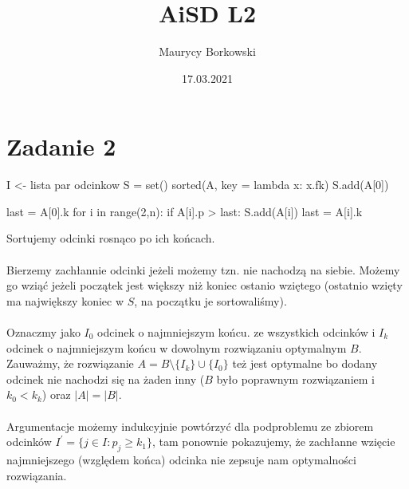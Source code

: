 \documentclass{article}
\title{AiSD L2}
\date{17.03.2021}
\author{Maurycy Borkowski}
\begin{document}
\maketitle

\section{Zadanie 2}
\begin{python}
I <- lista par odcinkow
S = set()
sorted(A, key = lambda x: x.fk)
S.add(A[0])

last = A[0].k
for i in range(2,n):
    if A[i].p > last:
        S.add(A[i])
        last = A[i].k
\end{python}
Sortujemy odcinki rosnąco po ich końcach.\\\\
Bierzemy zachłannie odcinki jeżeli możemy tzn. nie nachodzą na siebie. Możemy go wziąć jeżeli początek jest większy niż koniec ostanio wziętego (ostatnio wzięty ma największy koniec w $S$, na początku je sortowaliśmy).\\\\
Oznaczmy jako $I_0$ odcinek o najmniejszym końcu. ze wszystkich odcinków i $I_k$ odcinek o najmniejszym końcu w dowolnym rozwiązaniu optymalnym $B$. Zauważmy, że rozwiązanie $A = B \setminus \{I_k\} \cup \{I_0\}$ też jest optymalne bo dodany odcinek nie nachodzi się na żaden inny ($B$ było poprawnym rozwiązaniem i $k_0 < k_k$) oraz $|A| = |B|$.\\\\
Argumentacje możemy indukcyjnie powtórzyć dla podproblemu ze zbiorem odcinków $I^\prime = \{j \in I: p_j \geq k_1\}$, tam ponownie pokazujemy, że zachłanne wzięcie najmniejszego (względem końca) odcinka nie zepsuje nam optymalności rozwiązania.
\clearpage
\end{document}

